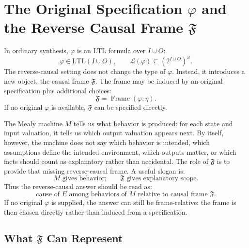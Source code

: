 \documentclass[11pt]{article}
\theoremstyle{remark}
\newcommand{\LTL}{\mathrm{LTL}}
\newcommand{\Lang}{\mathcal{L}}
\newcommand{\Frame}{\mathfrak{F}}
\newcommand{\Design}{\eta}
\begin{document}
\section{The Original Specification \texorpdfstring{\(\varphi\)}{phi} and the Reverse Causal Frame \texorpdfstring{\(\Frame\)}{F}}
\label{app:phi}

In ordinary synthesis, \(\varphi\) is an LTL formula over \(I\cup O\):
\[
  \varphi\in\LTL(I\cup O),
  \qquad
  \Lang(\varphi)\subseteq(2^{I\cup O})^\omega.
\]
The reverse-causal setting does not change the type of \(\varphi\). Instead, it
introduces a new object, the causal frame \(\Frame\). The frame may be induced
by an original specification plus additional choices:
\[
  \Frame=\operatorname{Frame}(\varphi;\Design).
\]
If no original \(\varphi\) is available, \(\Frame\) can be specified directly.

The Mealy machine \(M\) tells us what behavior is produced: for each state and
input valuation, it tells us which output valuation appears next. By itself,
however, the machine does not say which behavior is intended, which assumptions
define the intended environment, which outputs matter, or which facts should
count as explanatory rather than accidental. The role of \(\Frame\) is to
provide that missing reverse-causal frame. A useful slogan is:
\[
  M \text{ gives behavior;}
  \qquad
  \Frame \text{ gives explanatory scope.}
\]
Thus the reverse-causal answer should be read as:
\[
  \text{cause of } E
  \text{ among behaviors of } M
  \text{ relative to causal frame } \Frame.
\]
If no original \(\varphi\) is supplied, the answer can still be frame-relative:
the frame is then chosen directly rather than induced from a specification.

\subsection{What \texorpdfstring{\(\Frame\)}{F} Can Represent}
\end{document}
